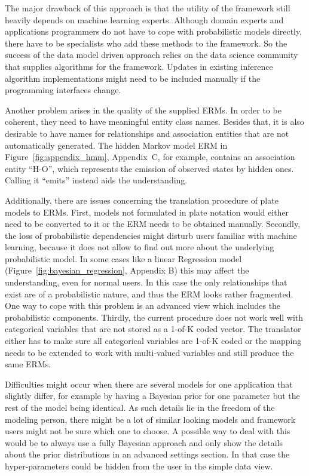 The major drawback of this approach is that the utility of the framework still heavily depends on machine learning experts. Although domain experts and applications programmers do not have to cope with probabilistic models directly, there have to be specialists who add these methods to the framework. So the success of the data model driven approach relies on the data science community that supplies algorithms for the framework. Updates in existing inference algorithm implementations might need to be included manually if the programming interfaces change.

Another problem arises in the quality of the supplied ERMs. In order to be coherent, they need to have meaningful entity class names. Besides that, it is also desirable to have names for relationships and association entities that are not automatically generated. The hidden Markov model ERM in Figure~\ref{fig:appendix_hmm}, Appendix~C, for example, contains an association entity ``H-O'', which represents the emission of observed states by hidden ones. Calling it ``emits'' instead aids the understanding.

Additionally, there are issues concerning the translation procedure of plate models to ERMs. First, models not formulated in plate notation would either need to be converted to it or the ERM needs to be obtained manually. Secondly, the loss of probabilistic dependencies might disturb users familiar with machine learning, because it does not allow to find out more about the underlying probabilistic model. In some cases like a linear Regression model (Figure~\ref{fig:bayesian_regression}, Appendix B) this may affect the understanding, even for normal users. In this case the only relationships that exist are of a probabilistic nature, and thus the ERM looks rather fragmented. One way to cope with this problem is an advanced view which includes the probabilistic components. Thirdly, the current procedure does not work well with categorical variables that are not stored as a 1-of-K coded vector. The translator either has to make sure all categorical variables are 1-of-K coded or the mapping needs to be extended to work with multi-valued variables and still produce the same ERMs.

Difficulties might occur when there are several models for one application that slightly differ, for example by having a Bayesian prior for one parameter but the rest of the model being identical. As such details lie in the freedom of the modeling person, there might be a lot of similar looking models and framework users might not be sure which one to choose. A possible way to deal with this would be to always use a fully Bayesian approach and only show the details about the prior distributions in an advanced settings section. In that case the hyper-parameters could be hidden from the user in the simple data view.

